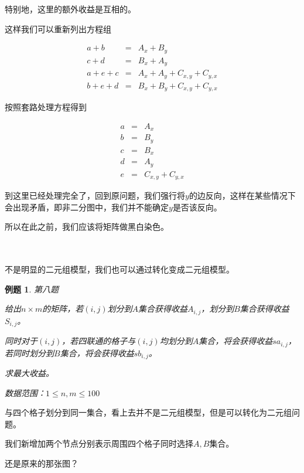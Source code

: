 \documentclass[a4paper]{article}
\newtheorem{problem}{例题}
\begin{document}
特别地，这里的额外收益是互相的。

这样我们可以重新列出方程组

\begin{eqnarray} 
  a + b &=& A_x+B_y \\
  c + d &=& B_x+A_y \\
  a+e+c &=& A_x+A_y+C_{x,y}+C_{y,x}\\
  b+e+d &=& B_x+B_y+C_{x,y}+C_{y,x} 
\end{eqnarray}

\newpage

按照套路处理方程得到

\begin{eqnarray*} 
  a &=& A_x \\
  b &=& B_y \\
  c &=& B_x \\
  d &=& A_y \\
  e &=& C_{x,y}+C_{y,x}
\end{eqnarray*}

到这里已经处理完全了，回到原问题，我们强行将$y$的边反向，这样在某些情况下会出现矛盾，即非二分图中，我们并不能确定$y$是否该反向。

所以在此之前，我们应该将矩阵做黑白染色。

~\\
~\\

不是明显的二元组模型，我们也可以通过转化变成二元组模型。

\begin{problem}
  第八题

  给出$n\times m$的矩阵，若$(i,j)$划分到$A$集合获得收益$A_{i,j}$，划分到$B$集合获得收益$S_{i,j}$。

  同时对于$(i,j)$，若四联通的格子与$(i,j)$均划分到$A$集合，将会获得收益$sa_{i,j}$，若同时划分到$B$集合，将会获得收益$sb_{i,j}$。

  求最大收益。

  数据范围：$1\le n,m\le 100$
\end{problem}

与四个格子划分到同一集合，看上去并不是二元组模型，但是可以转化为二元组问题。

我们新增加两个节点分别表示周围四个格子同时选择$A,B$集合。

还是原来的那张图？

\begin{figure}[htb]        
\end{figure}
\end{document}
